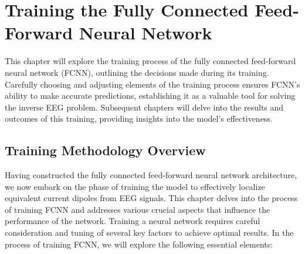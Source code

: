 \documentclass[a4paper, UKenglish, 11pt]{uiomaster}
\begin{document}
\chapter{Training the Fully Connected Feed-Forward Neural Network}
This chapter will explore the training process of the fully connected feed-forward neural network (FCNN), outlining the decisions made during its training. Carefully choosing and adjusting elements of the training process ensures FCNN's ability to make accurate predictions, establishing it as a valuable tool for solving the inverse EEG problem. Subsequent chapters will delve into the results and outcomes of this training, providing insights into the model's effectiveness.

\section{Training Methodology Overview}
Having constructed the fully connected feed-forward neural network architecture, we now embark on the phase of training the model to effectively localize equivalent current dipoles from EEG signals. This chapter delves into the process of training FCNN and addresses various crucial aspects that influence the performance of the network. Training a neural network requires careful consideration and tuning of several key factors to achieve optimal results. In the process of training FCNN, we will explore the following essential elements:
\end{document}
